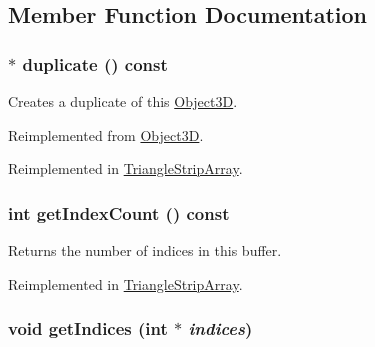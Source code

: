 \subsection{Member Function Documentation}
\hypertarget{classm3g_1_1IndexBuffer_fab6fc0a0ec393e527f849c3af10ad76}{
\subsubsection[{duplicate}]{ $\ast$ duplicate () const}}
\label{classm3g_1_1IndexBuffer_fab6fc0a0ec393e527f849c3af10ad76}


Creates a duplicate of this \hyperlink{classm3g_1_1Object3D}{Object3D}. 

Reimplemented from \hyperlink{classm3g_1_1Object3D_a25110dac934f867b83b73ad4741a0f4}{Object3D}.

Reimplemented in \hyperlink{classm3g_1_1TriangleStripArray_1623fbdfe91eb2e9d4a67bece6a46904}{TriangleStripArray}.\hypertarget{classm3g_1_1IndexBuffer_fe9ae2993ebcdb93d5ff26d57c81b73e}{
\subsubsection[{getIndexCount}]{\setlength{\rightskip}{0pt plus 5cm}int getIndexCount () const}}
\label{classm3g_1_1IndexBuffer_fe9ae2993ebcdb93d5ff26d57c81b73e}


Returns the number of indices in this buffer. 

Reimplemented in \hyperlink{classm3g_1_1TriangleStripArray_fe9ae2993ebcdb93d5ff26d57c81b73e}{TriangleStripArray}.\hypertarget{classm3g_1_1IndexBuffer_650953afac45099025a524ab160b911f}{
\subsubsection[{getIndices}]{\setlength{\rightskip}{0pt plus 5cm}void getIndices (int $\ast$ {\em indices})}}
\label{classm3g_1_1IndexBuffer_650953afac45099025a524ab160b911f}


